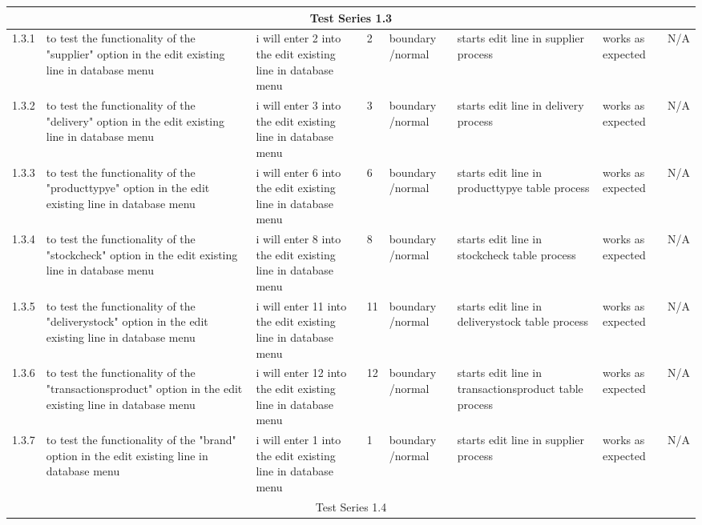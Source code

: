 \begin{landscape}
\begin{center}
\begin{longtable}{|p{1.5cm}|p{2.5cm}|p{2.5cm}|p{2cm}|p{2cm}|p{2cm}|p{2cm}|p{2cm}|}
\multicolumn{8}{c}{Test Series 1.3}\\ \hline
1.3.1 & to test the functionality of the "supplier" option in the edit existing line in database menu & i will enter 2 into the edit existing line in database menu & 2 & boundary /normal & starts edit line in supplier process & works as expected & N/A \\ \hline
1.3.2 & to test the functionality of the "delivery" option in the edit existing line in database menu & i will enter 3 into the edit existing line in database menu & 3 & boundary /normal & starts edit line in delivery process & works as expected & N/A \\ \hline
1.3.3 & to test the functionality of the "producttypye" option in the edit existing line in database menu & i will enter 6 into the edit existing line in database menu & 6 & boundary /normal & starts edit line in producttypye table process & works as expected & N/A \\ \hline
1.3.4 & to test the functionality of the "stockcheck" option in the edit existing line in database menu & i will enter 8 into the edit existing line in database menu & 8 & boundary /normal & starts edit line in stockcheck table process & works as expected & N/A \\ \hline
1.3.5 & to test the functionality of the "deliverystock" option in the edit existing line in database menu & i will enter 11 into the edit existing line in database menu & 11 & boundary /normal & starts edit line in deliverystock table process & works as expected & N/A \\ \hline
1.3.6 & to test the functionality of the "transactionsproduct" option in the edit existing line in database menu & i will enter 12 into the edit existing line in database menu & 12 & boundary /normal & starts edit line in transactionsproduct table process & works as expected & N/A \\ \hline
1.3.7 & to test the functionality of the "brand" option in the edit existing line in database menu & i will enter 1 into the edit existing line in database menu & 1 & boundary /normal & starts edit line in supplier process & works as expected & N/A \\ \hline
\multicolumn{8}{c}{Test Series 1.4}\\ \hline


\end{longtable}
\end{center}
\end{landscape}
